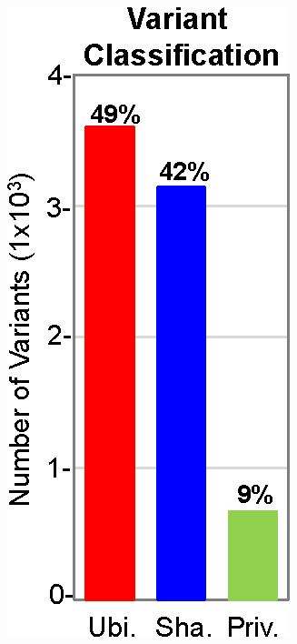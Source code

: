 \begin{figure}[htbp]
	\centering
	\begin{subfigure}{0.23\textwidth}
		\includegraphics[width=\textwidth,keepaspectratio]{images/303/variants_by_category}

\end{subfigure}
\end{figure}

